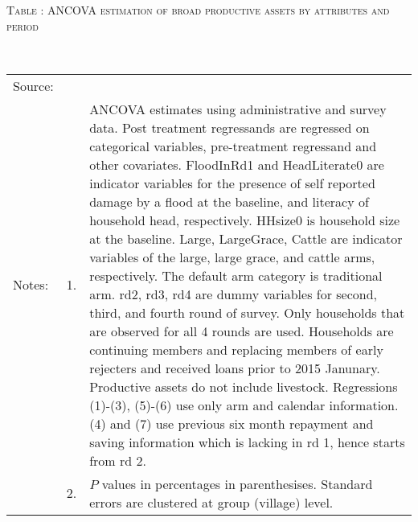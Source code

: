 \hspace{-1cm}\begin{minipage}[t]{14cm}
\hfil\textsc{\normalsize Table \thetable: ANCOVA estimation of broad productive assets by attributes and period\label{tab ANCOVA productive assets timevarying attributes}}\\
\setlength{\tabcolsep}{1pt}
\setlength{\baselineskip}{8pt}
\renewcommand{\arraystretch}{.55}
\hfil{}\\
\renewcommand{\arraystretch}{.8}
\setlength{\tabcolsep}{1pt}
\begin{tabular}{>{\hfill\scriptsize}p{1cm}<{}>{\hfill\scriptsize}p{.25cm}<{}>{\scriptsize}p{12cm}<{\hfill}}
Source:& \multicolumn{2}{l}{\scriptsize Estimated with GUK administrative and survey data.}\\
Notes: & 1. & ANCOVA estimates using administrative and survey data. Post treatment regressands are regressed on categorical variables, pre-treatment regressand and other covariates. \textsf{FloodInRd1} and \textsf{HeadLiterate0} are indicator variables for the presence of self reported damage by a flood at the baseline, and literacy of household head, respectively. \textsf{HHsize0} is household size at the baseline. \textsf{Large}, \textsf{LargeGrace}, \textsf{Cattle} are indicator variables of the \textsf{large}, \textsf{large grace}, and \textsf{cattle} arms, respectively. The default arm category is \textsf{traditional} arm. \textsf{rd2, rd3, rd4} are dummy variables for second, third, and fourth round of survey. Only households that are observed for all 4 rounds are used. Households are continuing members and replacing members of early rejecters and received loans prior to 2015 Janunary.  Productive assets do not include livestock. Regressions (1)-(3), (5)-(6) use only arm and calendar information. (4) and (7) use previous six month repayment and saving information which is lacking in rd 1, hence starts from rd 2.\\
& 2. & $P$ values in percentages in parenthesises. Standard errors are clustered at group (village) level.
\end{tabular}
\end{minipage}


